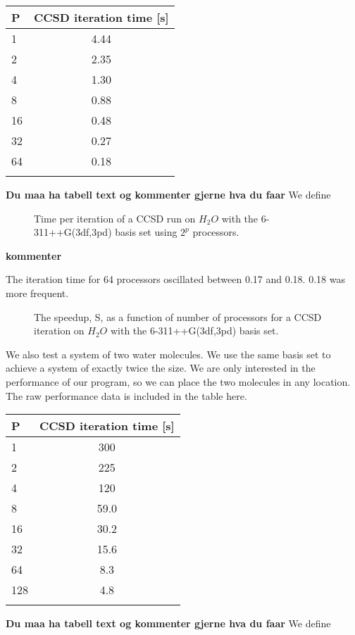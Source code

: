 \begin{center}
\begin{tabular}{ l c}
	\hline
  	P & CCSD iteration time [s] \\ \hline
  	1 & 4.44  \\ 
  	2 & 2.35   \\ 
  	4 & 1.30   \\
  	8 & 0.88    \\ 
  	16 & 0.48   \\ 
  	32 & 0.27   \\ 
  	64 & 0.18   \\ \hline
  	\\
	\end{tabular}
\end{center}
{\bf Du maa ha tabell text og kommenter gjerne hva du faar} We define
\begin{figure}[h!]
\begin{center}
\caption{Time per iteration of a CCSD run on $H_2O$ with the 6-311++G(3df,3pd) basis set using $2^p$ processors.}
\label{fig:ccsd_h2o_time_per_iter}
\end{center}
\end{figure}
{\bf kommenter}
\newpage

The iteration time for 64 processors oscillated between 0.17 and 0.18. 0.18 was more frequent. \\

\begin{figure}[h!]
\begin{center}
\caption{The speedup, S, as a function of number of processors for a CCSD iteration on $H_2O$ with the 6-311++G(3df,3pd) basis set.}
\label{fig:ccsd_h2o_time_speedup}
\end{center}
\end{figure}

We also test a system of two water molecules. We use the same basis
set to achieve a system of exactly twice the size. We are only
interested in the performance of our program, so we can place the two
molecules in any location. The raw performance data is included in the
table here.

\begin{center}
\begin{tabular}{ l c}
	\hline
  	P & CCSD iteration time [s] \\ \hline
  	1 & 300   \\ 
  	2 & 225   \\ 
  	4 & 120   \\
  	8 &  59.0  \\ 
  	16 & 30.2   \\ 
  	32 & 15.6   \\ 
  	64 & 8.3  \\
  	128 & 4.8 \\ \hline
  	\\
	\end{tabular}
\end{center}
{\bf Du maa ha tabell text og kommenter gjerne hva du faar} We define

